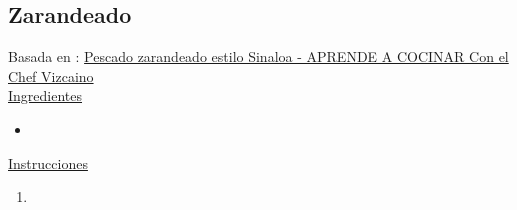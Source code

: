 \subsection{Zarandeado}

Basada en : \href{https://aprendeacocinarfacil.wordpress.com/2012/03/13/pescado-sarandeado-estilo-sinaloa-aya-pinchi/}{Pescado zarandeado estilo Sinaloa - APRENDE A COCINAR Con el Chef Vizcaino} \\

\underline{Ingredientes}
\begin{itemize}
\item 
\end{itemize}


\underline{Instrucciones}
\begin{enumerate}
\item 
\end{enumerate}
